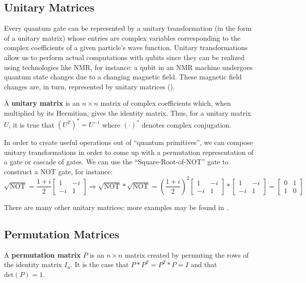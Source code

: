 \subsection{Unitary Matrices}
Every quantum gate can be represented by a unitary transformation (in the form of a unitary matrix) whose entries are complex variables corresponding to the complex coefficients of a given particle's wave function. Unitary transformations allow us to perform actual computations with qubits since they can be realized using technologies like NMR, for instance: a qubit in an NMR machine undergoes quantum state changes due to a changing magnetic field. These magnetic field changes are, in turn, represented by unitary matrices (\cite{Lukac2003}). 

\begin{mydef}
 A {\bf unitary matrix} is an $n \times n$ matrix of complex coefficients which, when multiplied by its Hermitian, gives the identity matrix. Thus, for a unitary matrix $U$, it is true that $(U^{T})^{*} = U^{-1}$ where $(\cdot)^{*}$ denotes complex conjugation.
\end{mydef}

In order to create useful operations out of ``quantum primitives'', we can compose unitary transformations in order to come up with a permutation representation of a gate or cascade of gates. We can use the ``Square-Root-of-NOT'' gate to construct a NOT gate, for instance:
\[ \sqrt{\text{NOT}} = \frac{1+i}{2}
  \left[
  \begin{matrix}
   1 & -i \\
   -i & 1
  \end{matrix}
  \right] \Rightarrow
  \sqrt{\text{NOT}}*\sqrt{\text{NOT}} = \left(\frac{1+i}{2}\right)^{2} \left[
  \begin{matrix}
   1 & -i \\
   -i & 1
  \end{matrix}
  \right] *
  \left[
  \begin{matrix}
   1 & -i \\
   -i & 1
  \end{matrix}
  \right] =
  \left[
  \begin{matrix}
   0 & 1 \\
   1 & 0
  \end{matrix}
  \right]
\]

There are many other unitary matrices: more examples may be found in \cite{Lukac2003}. 


\subsection{Permutation Matrices}
\begin{mydef}
 A {\bf permutation matrix} $P$ is an $n \times n$ matrix created by permuting the rows of the identity matrix $I_{n}$. It is the case that $P*P^{T}=P^{T}*P=I$ and that $\text{det}(P)=1$. 
\end{mydef}


